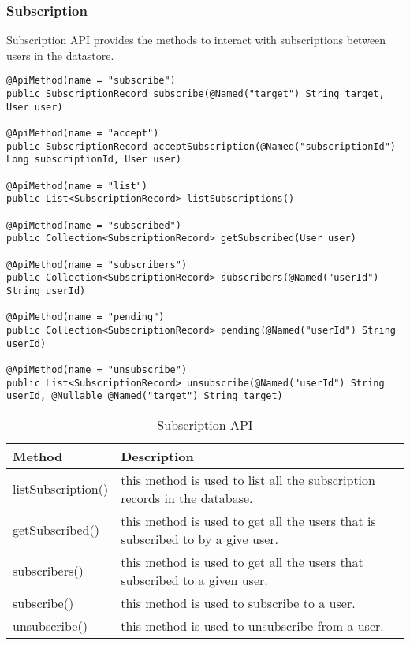 \subsubsection{Subscription}
Subscription API provides the methods to interact with subscriptions between users in the datastore. \\
\begin{minipage}{\linewidth}
\begin{lstlisting}
@ApiMethod(name = "subscribe")
public SubscriptionRecord subscribe(@Named("target") String target, User user)

@ApiMethod(name = "accept")
public SubscriptionRecord acceptSubscription(@Named("subscriptionId") Long subscriptionId, User user)

@ApiMethod(name = "list")
public List<SubscriptionRecord> listSubscriptions()

@ApiMethod(name = "subscribed")
public Collection<SubscriptionRecord> getSubscribed(User user)

@ApiMethod(name = "subscribers")
public Collection<SubscriptionRecord> subscribers(@Named("userId") String userId) 

@ApiMethod(name = "pending")
public Collection<SubscriptionRecord> pending(@Named("userId") String userId)

@ApiMethod(name = "unsubscribe")
public List<SubscriptionRecord> unsubscribe(@Named("userId") String userId, @Nullable @Named("target") String target)
\end{lstlisting}
\end{minipage}

\begin{table}
\begin{center}
    \begin{tabularx}{\textwidth}{| l | X |}
        \hline Method & Description \\
        \hline listSubscription() & 
            this method is used to list all the subscription records in the database. \\
        \hline getSubscribed() & 
            this method is used to get all the users that is subscribed to by a give user. \\
        \hline subscribers() & 
            this method is used to get all the users that subscribed to a given user. \\
        \hline subscribe() & 
            this method is used to subscribe to a user. \\
        \hline unsubscribe() & 
            this method is used to unsubscribe from a user. \\
        \hline
    \end{tabularx}
\end{center}
\caption{Subscription API}
\end{table}

